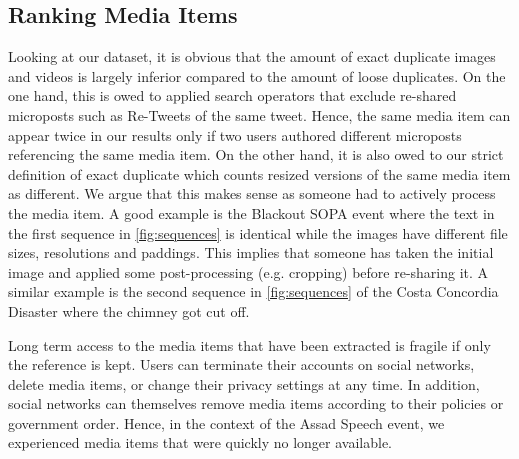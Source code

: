
\subsection{Ranking Media Items}
Looking at our dataset, it is obvious that the amount of exact duplicate images and videos is largely inferior compared to the amount of loose duplicates. On the one hand, this is owed to applied search operators that exclude re-shared microposts such as Re-Tweets of the same tweet. Hence, the same media item can appear twice in our results only if two users authored different microposts referencing the same media item. On the other hand, it is also owed to our strict definition of exact duplicate which counts resized versions of the same media item as different. We argue that this makes sense as someone had to actively process the media item. A good example is the Blackout SOPA event where the text in the first sequence in \autoref{fig:sequences} is identical while the images have different file sizes, resolutions and paddings. This implies that someone has taken the initial image and applied some post-processing (e.g. cropping) before re-sharing it. A similar example is the second sequence in \autoref{fig:sequences} of the Costa Concordia Disaster where the chimney got cut off.

Long term access to the media items that have been extracted is fragile if only the reference is kept. Users can terminate their accounts on social networks,
delete media items, or change their privacy settings at any time. In addition, social networks can themselves remove media items according to their policies or government order. Hence, in the context of the Assad Speech event, we experienced media items that were quickly no longer available.

